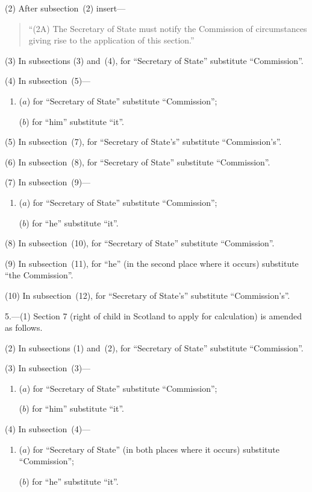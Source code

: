 \documentclass[12pt,a4paper]{article}
\begin{document}
(2) After subsection~(2) insert—
\begin{quotation}
“(2A) The Secretary of State must notify the Commission of circumstances giving rise to the application of this section.”
\end{quotation}

(3) In subsections (3) and~(4), for “Secretary of State” substitute “Commission”.

(4) In subsection~(5)—
\begin{enumerate}\item[]
($a$) for “Secretary of State” substitute “Commission”;

($b$) for “him” substitute “it”.
\end{enumerate}

(5) In subsection~(7), for “Secretary of State's” substitute “Commission's”.

(6) In subsection~(8), for “Secretary of State” substitute “Commission”.

(7) In subsection~(9)—
\begin{enumerate}\item[]
($a$) for “Secretary of State” substitute “Commission”;

($b$) for “he” substitute “it”.
\end{enumerate}

(8) In subsection~(10), for “Secretary of State” substitute “Commission”.

(9) In subsection~(11), for “he” (in the second place where it occurs) substitute “the Commission”.

(10) In subsection~(12), for “Secretary of State's” substitute “Commission's”.

\medskip

5.---(1) Section 7 (right of child in Scotland to apply for calculation) is amended as follows.

(2) In subsections (1) and~(2), for “Secretary of State” substitute “Commission”.

(3) In subsection~(3)—
\begin{enumerate}\item[]
($a$) for “Secretary of State” substitute “Commission”;

($b$) for “him” substitute “it”.
\end{enumerate}

(4) In subsection~(4)—
\begin{enumerate}\item[]
($a$) for “Secretary of State” (in both places where it occurs) substitute “Commission”;

($b$) for “he” substitute “it”.
\end{enumerate}
\end{document}

